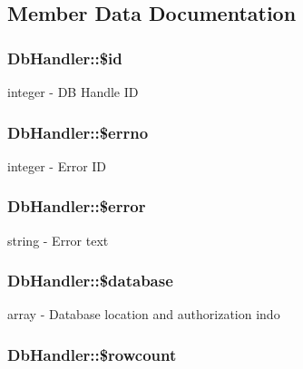 \subsection{Member Data Documentation}
\hypertarget{classDbHandler_d38e1c3312815c8ad4093957881092ff}{
\subsubsection{\setlength{\rightskip}{0pt plus 5cm}DbHandler::\$id}}
\label{classDbHandler_d38e1c3312815c8ad4093957881092ff}


integer - DB Handle ID \hypertarget{classDbHandler_f6e9f493be56617cb533763bb2a0e85a}{
\subsubsection{\setlength{\rightskip}{0pt plus 5cm}DbHandler::\$errno}}
\label{classDbHandler_f6e9f493be56617cb533763bb2a0e85a}


integer - Error ID \hypertarget{classDbHandler_de79e11156abbfc180864beb5b9df377}{
\subsubsection{\setlength{\rightskip}{0pt plus 5cm}DbHandler::\$error}}
\label{classDbHandler_de79e11156abbfc180864beb5b9df377}


string - Error text \hypertarget{classDbHandler_faac5248f9ee59786b48a7b51f318940}{
\subsubsection{\setlength{\rightskip}{0pt plus 5cm}DbHandler::\$database}}
\label{classDbHandler_faac5248f9ee59786b48a7b51f318940}


array - Database location and authorization indo \hypertarget{classDbHandler_56a7ae4bd7d842c85f3fe8052aecbfef}{
\subsubsection{\setlength{\rightskip}{0pt plus 5cm}DbHandler::\$rowcount}}
\label{classDbHandler_56a7ae4bd7d842c85f3fe8052aecbfef}


